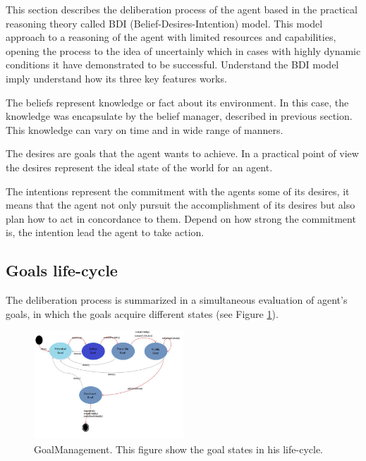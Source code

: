 This section describes the deliberation process of the agent based in the practical reasoning theory called BDI (Belief-Desires-Intention) model. This model approach to a reasoning of the agent with limited resources and capabilities, opening the process to the idea of uncertainly which in cases with highly dynamic conditions it have demonstrated to be successful. Understand the BDI model imply understand how its three key features works.

The beliefs represent knowledge or fact about its environment. In this case, the knowledge was encapsulate by the belief manager, described in previous section. This knowledge can vary on time and in wide range of manners.

The desires are goals that the agent wants to achieve. In a practical point of view the desires represent the ideal state of the world for an agent.

The intentions represent the commitment with the agents some of its desires, it means that the agent not only pursuit the accomplishment of its desires but also plan how to act in concordance to them. Depend on how strong the commitment is, the intention lead the agent to take action.

\subsection{Goals life-cycle}

The deliberation process is summarized in a simultaneous evaluation of agent's goals, in which the goals acquire different states (see Figure \ref{fig:GoalManager}).

\begin{figure}
	\centering
	\includegraphics[width=0.5\textwidth]{Images/GoalManagement.png} 
	\caption{GoalManagement. This figure show the goal states in his life-cycle.}
	\label{fig:GoalManager}
\end{figure}

